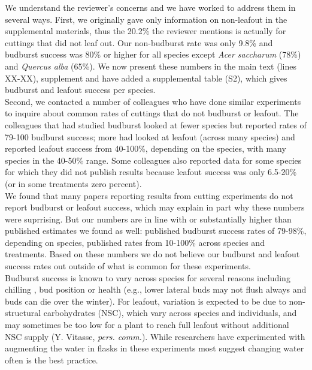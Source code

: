 \documentclass[11pt,a4paper]{article}
\begin{document}
We understand the reviewer's concerns and we have worked to address them in several ways. First, we originally gave only information on non-leafout in the supplemental materials, thus the 20.2\% the reviewer mentions is actually for cuttings that did not leaf out. Our non-budburst rate was only 9.8\% and budburst success was 80\% or higher for all species except \emph{Acer saccharum} (78\%) and \emph{Quercus alba} (65\%). We now present these numbers in the main text (lines XX-XX), supplement and have added a supplemental table (S2), which gives budburst and leafout success per species. \\

Second, we contacted a number of colleagues who have done similar experiments \citep[colleagues contacted included authors on the following paper][]{Caffarra:2011aa,Basler:2012aa,Polgar:2014aa,vitasseclippings,zohner2016ncc} to inquire about common rates of cuttings that do not budburst or leafout. The colleagues that had studied budburst looked at fewer species but reported rates of 79-100 budburst success; more had looked at leafout (across many species) and reported leafout success from 40-100\%, depending on the species, with many species in the 40-50\% range. Some colleagues also reported data for some species for which they did not publish results because leafout success was only 6.5-20\% (or in some treatments zero percent). \\

We found that many papers reporting results from cutting experiments do not report budburst or leafout success, which may explain in part why these numbers were suprrising. But our numbers are in line with or substantially higher than published estimates we found as well: \citet{Basler:2012aa} published budburst success rates of 79-98\%, depending on species, \citet{laube2014gcb} published rates from 10-100\% across species and treatments. Based on these numbers we do not believe our budburst and leafout success rates out outside of what is common for these experiments.\\

Budburst success is known to vary across species for several reasons including chilling \citep{laube2014gcb}, bud position or health (e.g., lower lateral buds may not flush always and buds can die over the winter). For leafout, variation is expected to be due to non-structural carbohydrates (NSC), which vary across species and individuals, and may sometimes be too low for a plant to reach full leafout without additional NSC supply (Y. Vitasse, \emph{pers. comm.}). While researchers have experimented with augmenting the water in flasks in these experiments most suggest changing water often is the best practice.\\
\end{document}
